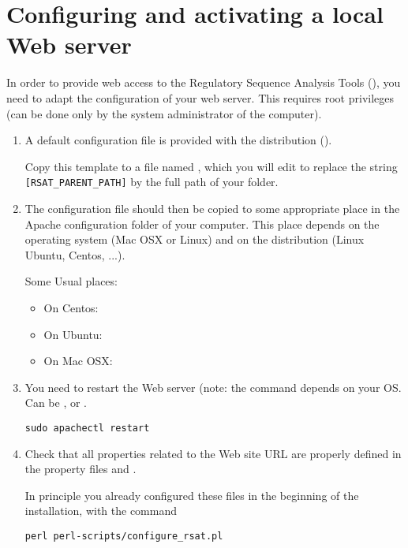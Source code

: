 \section{Configuring and activating a local \RSAT Web server}

In order to provide web access to the Regulatory Sequence Analysis
Tools (\RSAT), you need to adapt the configuration of your web
server. This requires root privileges (can be done only by the system
administrator of the computer).


\begin{enumerate}
\item A default configuration file is provided with the \RSAT
  distribution (). 

  Copy this template to a file named , which you will
  edit to replace the string \texttt{[RSAT\_PARENT\_PATH]} by the
  full path of your  folder.
  
\item The configuration file should then be copied to some appropriate
  place in the Apache configuration folder of your computer. This
  place depends on the operating system (Mac OSX or Linux) and on the
  distribution (Linux Ubuntu, Centos, ...).
  
  Some Usual places:
  \begin{itemize}
  \item On Centos: 
  \item On Ubuntu: 
  \item On Mac OSX: 
  \end{itemize}
  
\item You need to restart the Web server (note: the command depends on
  your OS. Can be ,  or
  .

  \begin{lstlisting}
sudo apachectl restart
  \end{lstlisting}


\item Check that all properties related to the Web site URL are
  properly defined in the \RSAT property files
   and
  . 

  In principle you already configured these files in the beginning of
  the installation, with the command
  \begin{lstlisting}
perl perl-scripts/configure_rsat.pl
  \end{lstlisting}


\end{enumerate}
